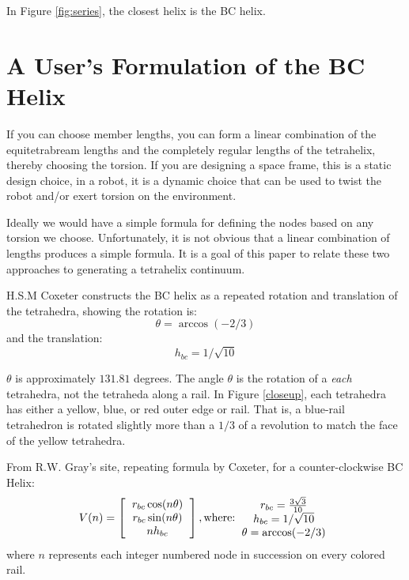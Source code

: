 \documentclass[11pt]{article}
\begin{document}
In Figure
\ref{fig:series}, the closest helix is the BC helix.

\section{A User's Formulation of the BC Helix}

If you can choose member lengths, you can form a linear combination of
the equitetrabream lengths and the completely regular lengths of the
tetrahelix, thereby choosing the torsion.  If you are designing a
space frame, this is a static design choice, in a robot, it is a
dynamic choice that can be used to twist the robot and/or exert
torsion on the environment.

Ideally we would have a simple formula for defining the nodes based on
any torsion we choose.  Unfortunately, it is not obvious that a linear
combination of lengths produces a simple formula.  It is a goal of
this paper to relate these two approaches to generating a tetrahelix
continuum.

H.S.M Coxeter constructs the BC helix\cite{coxeter1985simplicial} as a repeated rotation and translation of the tetrahedra, showing the
rotation is:
\[
\theta = \arccos(-2/3) 
\]
and the translation:
\[
h_{bc} = 1/\sqrt{10}
\]

$\theta$ is approximately $131.81$ degrees.
The angle $\theta$ is the rotation of a \emph{each} tetrahedra, not the tetraheda along a rail.  In Figure \ref{closeup},
each tetrahedra has either a yellow, blue, or red outer edge or rail.
That is, a blue-rail tetrahedron is rotated slightly more than a $1/3$ of a revolution to match the face of the yellow tetrahedra.

From R.W. Gray's site\cite{graytetrahelix}, repeating formula by Coxeter\cite{coxeter1985simplicial}, for a counter-clockwise BC Helix:
\begin{equation}
  \label{graycoxeter}
V(n) =
\left [
  \begin{tabular}{c}
   $ r_{bc} \cos(n \theta) $\\
   $ r_{bc} \sin(n \theta) $\\
   $ n h_{bc}  $
  \end{tabular}
  \right ],
\text{where:}
  \begin{tabular}{c}
 $ r_{bc} = \frac{3\sqrt{3}}{10} $\\
 $ h_{bc} = 1/\sqrt{10} $ \\
 $ \theta = \arccos(-2/3) $ \\
  \end{tabular}      
\end{equation}
where $n$ represents each integer numbered node in succession on every colored rail.
\end{document}
